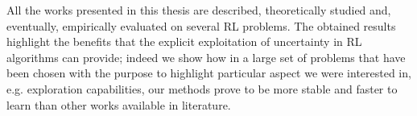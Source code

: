 All the works presented in this thesis are described, theoretically studied and, eventually, empirically evaluated on several RL problems. The obtained results highlight the benefits that the explicit exploitation of uncertainty in RL algorithms can provide; indeed we show how in a large set of problems that have been chosen with the purpose to highlight particular aspect we were interested in, e.g. exploration capabilities, our methods prove to be more stable and faster to learn than other works available in literature.
